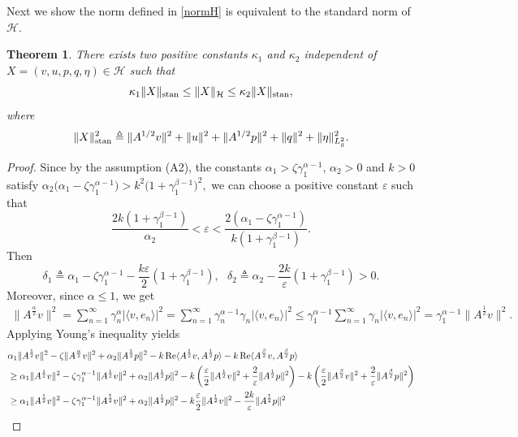 \documentclass[12pt,reqno]{article}
\newtheorem{theorem}{Theorem}[section] %
\begin{document}
	Next we show the norm defined in \eqref{normH} is equivalent to the standard norm of $\mathcal{H}$.
	\begin{theorem}\label{thmequinorm}
		There exists two positive constants $\kappa_1$ and $\kappa_2$ independent of $X=(v,u,p,q,\eta)\in\mathcal{H}$ such that
		$$\kappa_1\|X\|_{\rm stan}\le \|X\|_{\mathcal{H}}\le\kappa_2\|X\|_{\rm stan},$$
		where
		$$\|X\|_{\rm stan}^2\triangleq\|A^{1/2}v\|^2+\|u\|^2+\|A^{1/2}p\|^2+\|q\|^2+\|\eta\|_{L^2_g}^2.$$
	\end{theorem}
	\begin{proof}
		Since by the assumption (A2), the constants $\alpha_1>\zeta\gamma_1^{\alpha-1}$, $\alpha_2>0$ and $k>0$ satisfy
		\(
		\alpha_2\big(\alpha_1 - \zeta \gamma_1^{\alpha-1}\big)
		> k^2\big(1 + \gamma_1^{\beta-1}\big)^2,
		\)
		we can choose a positive constant $\varepsilon$ such that
		\[\dfrac{2k\left(1 + \gamma_1^{\beta-1}\right)}{\alpha_2}<\varepsilon< \dfrac{2\left(\alpha_1 - \zeta \gamma_1^{\alpha-1}\right)}{k\left(1 + \gamma_1^{\beta-1}\right)}.\]
		Then
		\[\delta_1\triangleq\alpha_1 - \zeta \gamma_1^{\alpha-1} - \dfrac{k\varepsilon}{2}
		\left(1 + \gamma_1^{\beta-1}\right),~~~\delta_2\triangleq \alpha_2 - \dfrac{2k}{\varepsilon}
		\left(1 + \gamma_1^{\beta-1}\right) > 0.\]
		Moreover, since $\alpha\le 1$, we get
		\begin{align*}
			\|A^{\frac{\alpha}{2}}v\|^2=\sum_{n=1}^\infty\gamma_n^\alpha|\langle v,e_n\rangle|^2=\sum_{n=1}^\infty\gamma_n^{\alpha-1}\gamma_n|\langle v,e_n\rangle|^2\le\gamma_1^{\alpha-1}\sum_{n=1}^\infty\gamma_n|\langle v,e_n\rangle|^2=\gamma_1^{\alpha-1}\|A^{\frac{1}{2}}v\|^2.
		\end{align*}
		Applying Young's inequality yields
		\begin{align}\label{coer}
			& \alpha_1 \|A^{\frac{1}{2}}v\|^2 - \zeta \|A^{\frac{\alpha}{2}}v\|^2 + \alpha_2 \|A^{\frac{1}{2}}p\|^2
			- k\operatorname{Re}\langle A^{\frac{1}{2}}v, A^{\frac{1}{2}}p\rangle
			- k\operatorname{Re}\langle A^{\frac{\beta}{2}}v, A^{\frac{\beta}{2}}p\rangle \notag\\
			& \ge \alpha_1 \|A^{\frac{1}{2}}v\|^2 - \zeta\gamma_1^{\alpha-1} \|A^{\frac{1}{2}}v\|^2 + \alpha_2 \|A^{\frac{1}{2}}p\|^2  - k\left(\frac{\varepsilon}{2}\|A^{\frac{1}{2}}v\|^2 + \frac{2}{\varepsilon}\|A^{\frac{1}{2}}p\|^2\right)
			- k\left(\frac{\varepsilon}{2}\|A^{\frac{\beta}{2}}v\|^2 + \frac{2}{\varepsilon}\|A^{\frac{\beta}{2}}p\|^2\right)  \notag\\
			& \ge \alpha_1 \|A^{\frac{1}{2}}v\|^2 - \zeta\gamma_1^{\alpha-1} \|A^{\frac{1}{2}}v\|^2 + \alpha_2 \|A^{\frac{1}{2}}p\|^2  - k\frac{\varepsilon}{2}\|A^{\frac{1}{2}}v\|^2 - \frac{2k}{\varepsilon}\|A^{\frac{1}{2}}p\|^2

\end{align}
\end{proof}
\end{document}
